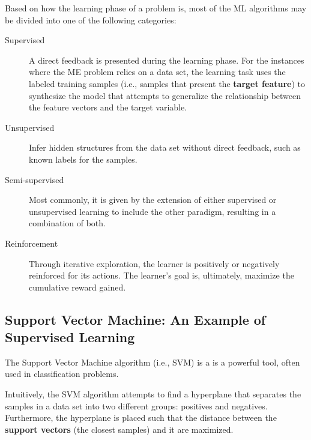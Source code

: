 \documentclass[12pt]{report}
\begin{document}
Based on how the learning phase of a problem is, most of the ML algorithms may be divided into one of the following categories:

\begin{description}
	\item[Supervised] A direct feedback is presented during the learning phase. \cite{pat1996} For the instances where the ME problem relies on a data set, the learning task uses the labeled training samples (i.e., samples that present the \textbf{target feature}) to synthesize the model that attempts to generalize the relationship between the feature vectors and the target variable. \cite{awa2015}

	\item[Unsupervised] Infer hidden structures from the data set without direct feedback, such as known labels for the samples. \cite{awa2015}

	\item[Semi-supervised] Most commonly, it is given by the extension of either supervised or unsupervised learning to include the other paradigm, resulting in a combination of both. \cite{zhu2009}

	\item[Reinforcement] Through iterative exploration, the learner is positively or negatively reinforced for its actions. The learner's goal is, ultimately, maximize the cumulative reward gained. \cite{awa2015}
\end{description}

\subsection{Support Vector Machine: An Example of Supervised Learning}

The Support Vector Machine algorithm (i.e., SVM) is a is a powerful tool, often used in classification problems.

Intuitively, the SVM algorithm attempts to find a hyperplane that separates the samples in a data set into two different groups: positives and negatives. Furthermore, the hyperplane is placed such that the distance between the \textbf{support vectors} (the closest samples) and it are maximized.
\end{document}
